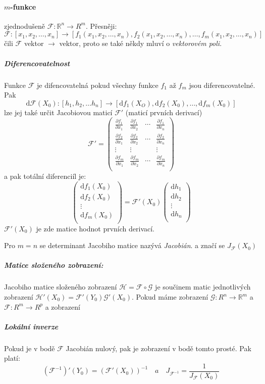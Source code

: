 \documentclass[a4paper, twoside,%
12pt]{article}
\newcommand{\dif}{\mathrm{d}}
\newcommand{\R}{\mathbb{R}}
\newcommand{\pard}[2]{\frac{\partial #1 }{\partial #2 }}
\newcommand{\F}{\mathscr{F}}
\newcommand{\G}{\mathscr{G}}
\newcommand{\Hz}{\mathscr{H}}
\begin{document}
\paragraph{$m$-funkce} zjednodušeně $\F : \R^n \to R^m $. Přesněji:
$$\F: [x_1, x_2, \dots, x_n] \to [f_1(x_1, x_2, \dots, x_n), f_2(x_1, x_2, \dots, x_n), \dots, f_m(x_1, x_2, \dots, x_n)] $$
čili $\F$ vektor $\to$ vektor, proto se také někdy mluví o \emph{vektorovém poli}.

\subparagraph{Diferencovatelnost}
Funkce $\F$ je difencovatelná pokud všechny funkce  $f_1$ až $f_m$ jsou diferencovatelné. Pak
$$\dif\F(X_0): [h_1, h_2, \dots h_n] \to [\dif f_1(X_O), \dif f_2(X_0), \dots, \dif f_m(X_0)]$$
lze jej také určit Jacobiovou maticí $\F'$ (maticí prvních derivací)
$$ \F' = \left(\begin{array}{cccc}
    \pard{f_1}{x_1}&\pard{f_1}{x_2}& \cdots &\pard{f_1}{x_n}\\
    \pard{f_2}{x_1}&\pard{f_2}{x_2}& \cdots &\pard{f_2}{x_n}\\
    \vdots&\vdots&  & \vdots\\
    \pard{f_m}{x_1}&\pard{f_m}{x_2}& \cdots &\pard{f_m}{x_n}\\
\end{array} \right) $$
a pak totální diferenciíl je:
$$\left(\begin{array}{c}
    \dif f_1 (X_0)\\
    \dif f_2 (X_0)\\
    \vdots\\
    \dif f_m (X_0)\\
\end{array} \right) = \F' (X_0) \left( \begin{array}{c}
    \dif h_1 \\
    \dif h_2 \\
    \vdots\\
    \dif h_n \\
\end{array}
\right) $$
$\F' (X_0)$ je zde matice hodnot prvních derivací.

Pro $m=n$ se determinant Jacobiho matice nazývá \emph{Jacobián}. a značí se $J_\F (X_0)$

\subparagraph{Matice složeného zobrazení:} Jacobiho matice složeného zobrazení $\Hz = \F \circ \G$ je součinem matic jednotlivých zobrazení $\Hz' (X_0) = \F'(Y_0) \G'(X_0)$. Pokud máme zobrazení $\G : R^n \to \R^m $ a $\F : R^m \to R^p$ a zobrazení 

\subparagraph{Lokální inverze} Pokud je v bodě $\F$ Jacobián nulový, pak je zobrazení v bodě tomto prosté. Pak platí:
$$ (\F^{-1})'(Y_0)=(\F'(X_0))^{-1} \quad a \quad J_{\F^{-1}} = \frac{1}{J_\F (X_0)} $$
\end{document}
